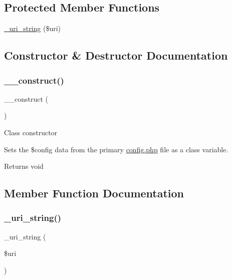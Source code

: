 \subsection*{Protected Member Functions}
\begin{DoxyCompactItemize}
\item 
\mbox{\hyperlink{class_c_i___config_a8a0a35d53f0904d9f655e82804b9998d}{\+\_\+uri\+\_\+string}} (\$uri)
\end{DoxyCompactItemize}


\subsection{Constructor \& Destructor Documentation}
\mbox{\label{class_c_i___config_a095c5d389db211932136b53f25f39685}} 
\subsubsection{\texorpdfstring{\+\_\+\+\_\+construct()}{\_\_construct()}}
{\footnotesize\ttfamily \+\_\+\+\_\+construct (\begin{DoxyParamCaption}{ }\end{DoxyParamCaption})}

Class constructor

Sets the \$config data from the primary \mbox{\hyperlink{_config_8php}{config.\+php}} file as a class variable.

\begin{DoxyReturn}{Returns}
void 
\end{DoxyReturn}


\subsection{Member Function Documentation}
\mbox{\label{class_c_i___config_a8a0a35d53f0904d9f655e82804b9998d}} 
\subsubsection{\texorpdfstring{\+\_\+uri\+\_\+string()}{\_uri\_string()}}
{\footnotesize\ttfamily \+\_\+uri\+\_\+string (\begin{DoxyParamCaption}\item[{}]{\$uri }\end{DoxyParamCaption})\hspace{0.3cm}{\ttfamily [protected]}}

